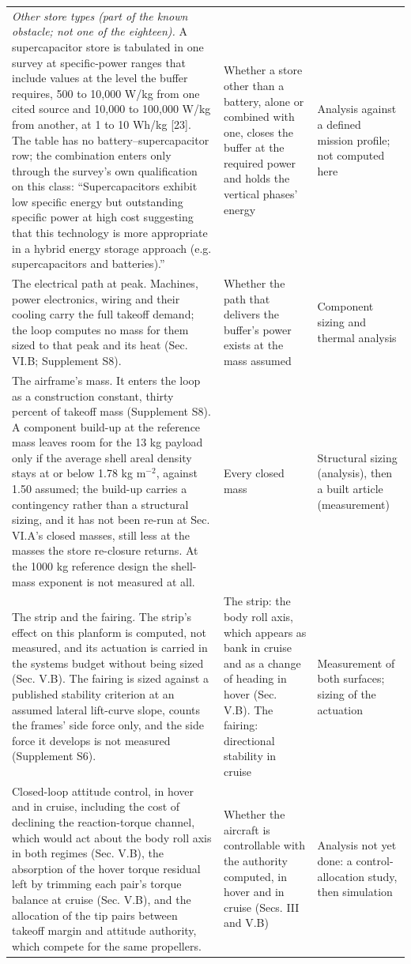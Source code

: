 \documentclass[journal]{new-aiaa}
\begin{document}
\begin{table}[htbp]
\begin{tabularx}{\linewidth}{XXX}
\textit{Other store types (part of the known obstacle; not one of the eighteen).} A supercapacitor store is tabulated in one survey at specific-power ranges that include values at the level the buffer requires, 500 to 10,000 W/kg from one cited source and 10,000 to 100,000 W/kg from another, at 1 to 10 Wh/kg [23]. The table has no battery--supercapacitor row; the combination enters only through the survey's own qualification on this class: ``Supercapacitors exhibit low specific energy but outstanding specific power at high cost suggesting that this technology is more appropriate in a hybrid energy storage approach (e.g. supercapacitors and batteries).'' & Whether a store other than a battery, alone or combined with one, closes the buffer at the required power and holds the vertical phases' energy & Analysis against a defined mission profile; not computed here \\
The electrical path at peak. Machines, power electronics, wiring and their cooling carry the full takeoff demand; the loop computes no mass for them sized to that peak and its heat (Sec. VI.B; Supplement S8). & Whether the path that delivers the buffer's power exists at the mass assumed & Component sizing and thermal analysis \\
The airframe's mass. It enters the loop as a construction constant, thirty percent of takeoff mass (Supplement S8). A component build-up at the reference mass leaves room for the 13 kg payload only if the average shell areal density stays at or below 1.78 kg m$^{-2}$, against 1.50 assumed; the build-up carries a contingency rather than a structural sizing, and it has not been re-run at Sec. VI.A's closed masses, still less at the masses the store re-closure returns. At the 1000 kg reference design the shell-mass exponent is not measured at all. & Every closed mass & Structural sizing (analysis), then a built article (measurement) \\
The strip and the fairing. The strip's effect on this planform is computed, not measured, and its actuation is carried in the systems budget without being sized (Sec. V.B). The fairing is sized against a published stability criterion at an assumed lateral lift-curve slope, counts the frames' side force only, and the side force it develops is not measured (Supplement S6). & The strip: the body roll axis, which appears as bank in cruise and as a change of heading in hover (Sec. V.B). The fairing: directional stability in cruise & Measurement of both surfaces; sizing of the actuation \\
Closed-loop attitude control, in hover and in cruise, including the cost of declining the reaction-torque channel, which would act about the body roll axis in both regimes (Sec. V.B), the absorption of the hover torque residual left by trimming each pair's torque balance at cruise (Sec. V.B), and the allocation of the tip pairs between takeoff margin and attitude authority, which compete for the same propellers. & Whether the aircraft is controllable with the authority computed, in hover and in cruise (Secs. III and V.B) & Analysis not yet done: a control-allocation study, then simulation \\

\end{tabularx}
\end{table}
\end{document}
